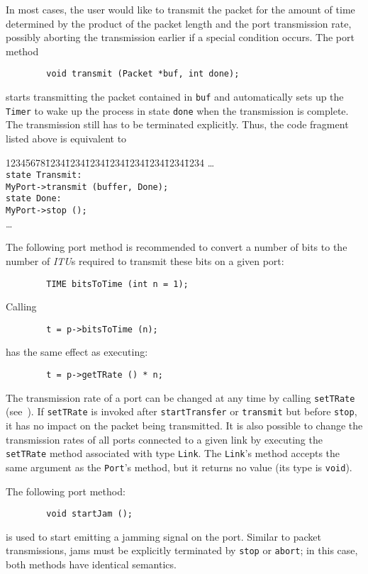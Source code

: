In most cases, the user would like to transmit the packet
for the amount of time determined by the product of the packet length and
the port transmission rate, possibly aborting the transmission earlier if a
special condition occurs.
The port method
\begin{verbatim}
        void transmit (Packet *buf, int done);
\end{verbatim}
starts transmitting the packet contained in {\tt buf} and automatically
sets up the {\tt Timer} to wake up the process in state {\tt done} when the
transmission is complete.
The transmission still has to be terminated explicitly.
Thus, the code fragment listed above is equivalent to
{\tt\begin{tabbing}
12345678\=1234\=1234\=1234\=1234\=1234\=1234\=1234\=1234\kill
\> \ldots \\
\> {\tt state Transmit:}\\
\> \> {\tt MyPort->transmit (buffer, Done);}\\
\> {\tt state Done:}\\
\> \> {\tt MyPort->stop ();}\\
\> \>\ldots
\end{tabbing}}

The following port method is recommended
to convert a number of bits to the number of {\em ITU\/}s
required to transmit these bits on a given port:
\begin{verbatim}
        TIME bitsToTime (int n = 1);
\end{verbatim}
Calling
\begin{verbatim}
        t = p->bitsToTime (n);
\end{verbatim}
has the same effect as executing:
\begin{verbatim}
        t = p->getTRate () * n;
\end{verbatim}

\medskip

The transmission rate of a port can be changed at any time
by calling {\tt setTRate} (see~).
If {\tt setTRate} is invoked after {\tt startTransfer} or {\tt transmit} but
before {\tt stop}, it has no impact on the packet being transmitted.
It is also possible to change the transmission rates of all ports connected
to a given link by executing the {\tt setTRate} method associated with type
{\tt Link}.
The {\tt Link}'s method accepts the same argument as the {\tt Port}'s method,
but it returns no value (its type is {\tt void}).

The following port method:
\begin{verbatim}
        void startJam ();
\end{verbatim}
is used to start emitting a jamming signal on the port.
Similar to packet transmissions, jams must be explicitly terminated
by {\tt stop} or {\tt abort}; in this case, both methods have identical
semantics.

